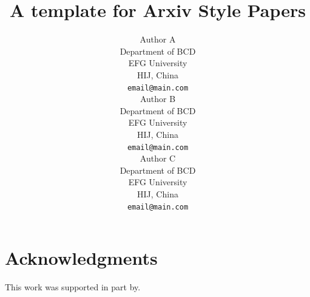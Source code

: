 \documentclass[12pt]{article}
\title{A template for Arxiv Style Papers}
\author{
  Author A \\
  Department of BCD \\
  EFG University \\
  HIJ, China \\
  \texttt{email@main.com} \\
  \And
  Author B \\
  Department of BCD \\
  EFG University \\
  HIJ, China \\
  \texttt{email@main.com} \\
  \And
  Author C \\
  Department of BCD \\
  EFG University \\
  HIJ, China \\
  \texttt{email@main.com} \\
}
\begin{document}
\maketitle












\section*{Acknowledgments}
This work was supported in part by.



\end{document}
